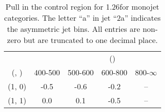 \begin{table}[h!]
\tiny
\centering
\caption{Pull in the \gj control region for 1.26\ifb for monojet categories. The letter ``a'' in jet \eg ``2a''  indicates the asymmetric jet bins. All entries are non-zero but are truncated to one decimal place.\label{tab:pullsep_gj_ewk_mono}}
\begin{tabular}
{ccccc}
	\hline\hline
&	& \multicolumn{4}{c}{\scalht (\gev)} \\ 
	 (\njet,  \nb) & 400-500 & 500-600 & 600-800 & 800-$\infty$ \\ [0.8ex] 
\hline
	(1, 0) & -0.5 & -0.6 & -0.2 & -- \\[0.5ex] 
	(1, 1) & 0.0 & 0.1 & -0.5 & -- \\[0.5ex] 
	\hline
	\hline
\end{tabular}
\end{table}

